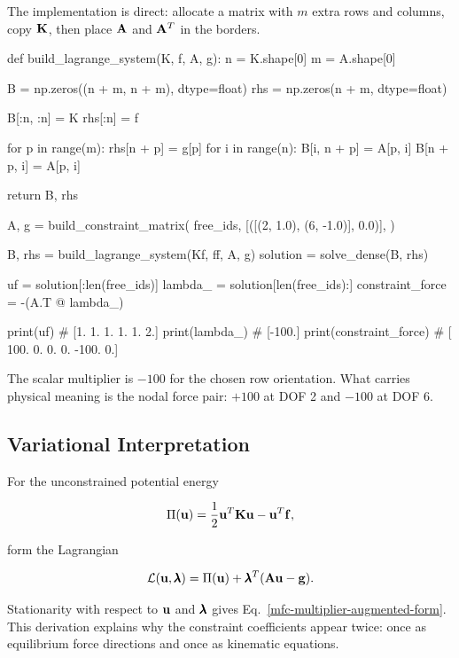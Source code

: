 The implementation is direct: allocate a matrix with $m$ extra rows and columns,
copy $\mathbf{K}$, then place $\mathbf{A}$ and $\mathbf{A}^T$ in the borders.

\begin{python}
def build_lagrange_system(K, f, A, g):
    n = K.shape[0]
    m = A.shape[0]

    B = np.zeros((n + m, n + m), dtype=float)
    rhs = np.zeros(n + m, dtype=float)

    B[:n, :n] = K
    rhs[:n] = f

    for p in range(m):
        rhs[n + p] = g[p]
        for i in range(n):
            B[i, n + p] = A[p, i]
            B[n + p, i] = A[p, i]

    return B, rhs


A, g = build_constraint_matrix(
    free_ids,
    [([(2, 1.0), (6, -1.0)], 0.0)],
)

B, rhs = build_lagrange_system(Kf, ff, A, g)
solution = solve_dense(B, rhs)

uf = solution[:len(free_ids)]
lambda_ = solution[len(free_ids):]
constraint_force = -(A.T @ lambda_)

print(uf)                # [1. 1. 1. 1. 1. 2.]
print(lambda_)           # [-100.]
print(constraint_force)  # [ 100.   0.   0.   0. -100.   0.]
\end{python}

The scalar multiplier is $-100$ for the chosen row orientation. What carries
physical meaning is the nodal force pair: $+100$ at DOF 2 and $-100$ at DOF 6.

\subsection{Variational Interpretation}

For the unconstrained potential energy

\begin{equation}
    \Pi(\mathbf{u})=\frac{1}{2}\mathbf{u}^T\mathbf{K}\mathbf{u}-\mathbf{u}^T\mathbf{f},
\end{equation}

form the Lagrangian

\begin{equation}
    \mathcal{L}(\mathbf{u},\pmb{\lambda})
    =\Pi(\mathbf{u})+\pmb{\lambda}^T(\mathbf{A}\mathbf{u}-\mathbf{g}).
\end{equation}

Stationarity with respect to $\mathbf{u}$ and $\pmb{\lambda}$ gives
Eq.~\eqref{mfc-multiplier-augmented-form}. This derivation explains why the
constraint coefficients appear twice: once as equilibrium force directions and
once as kinematic equations.

